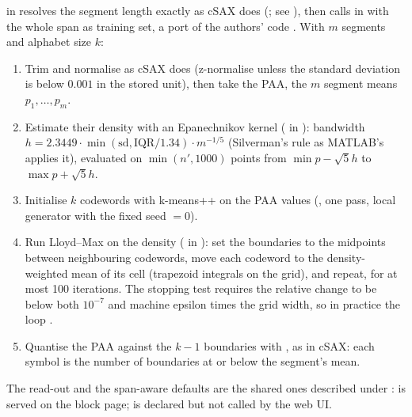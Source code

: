  in  resolves the segment length exactly as
cSAX does (; see ), then calls 
in  with the whole span as training set, a
port of the authors' code \citep{bountrogiannis2021datadriven,bountrogiannis2022distribution}.
With $m$ segments and alphabet size $k$:
\begin{enumerate}
\item Trim and normalise as cSAX does (z-normalise unless the standard deviation is below
  $0.001$ in the stored unit), then take the PAA, the $m$ segment means $p_1,\dots,p_m$.
\item Estimate their density with an Epanechnikov kernel ( in
  ): bandwidth $h = 2.3449\cdot\min(\mathrm{sd}, \mathrm{IQR}/1.34)\cdot m^{-1/5}$
  (Silverman's rule as MATLAB's  applies it), evaluated on
  $\min(n', 1000)$ points from $\min p - \sqrt5 h$ to $\max p + \sqrt5 h$.
\item Initialise $k$ codewords with k-means++ on the PAA values (, one pass,
  local generator with the fixed seed  $=0$).
\item Run Lloyd--Max on the density ( in ): set the
  boundaries to the midpoints between neighbouring codewords, move each codeword to the
  density-weighted mean of its cell (trapezoid integrals on the grid), and repeat, for at
  most 100 iterations. The stopping test requires the relative change to be below both
  $10^{-7}$ and machine epsilon times the grid width, so in practice the loop
  .
\item Quantise the PAA against the $k-1$ boundaries with , as in
  cSAX: each symbol is the number of boundaries at or below the segment's mean.
\end{enumerate}
The read-out and the span-aware defaults are the shared ones described under
:  is served on the block page;
 is declared but not called by the web UI.

